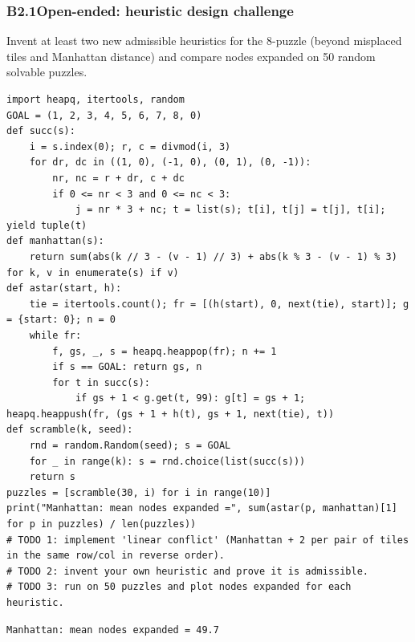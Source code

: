 \documentclass[11pt]{article}
\begin{document}
\subsubsection*{B2.1\quad Open-ended: heuristic design challenge}
Invent at least two new admissible heuristics for the 8-puzzle (beyond misplaced tiles and Manhattan distance) and compare nodes expanded on 50 random solvable puzzles.
\begin{lstlisting}[style=py]
import heapq, itertools, random
GOAL = (1, 2, 3, 4, 5, 6, 7, 8, 0)
def succ(s):
    i = s.index(0); r, c = divmod(i, 3)
    for dr, dc in ((1, 0), (-1, 0), (0, 1), (0, -1)):
        nr, nc = r + dr, c + dc
        if 0 <= nr < 3 and 0 <= nc < 3:
            j = nr * 3 + nc; t = list(s); t[i], t[j] = t[j], t[i]; yield tuple(t)
def manhattan(s):
    return sum(abs(k // 3 - (v - 1) // 3) + abs(k % 3 - (v - 1) % 3) for k, v in enumerate(s) if v)
def astar(start, h):
    tie = itertools.count(); fr = [(h(start), 0, next(tie), start)]; g = {start: 0}; n = 0
    while fr:
        f, gs, _, s = heapq.heappop(fr); n += 1
        if s == GOAL: return gs, n
        for t in succ(s):
            if gs + 1 < g.get(t, 99): g[t] = gs + 1; heapq.heappush(fr, (gs + 1 + h(t), gs + 1, next(tie), t))
def scramble(k, seed):
    rnd = random.Random(seed); s = GOAL
    for _ in range(k): s = rnd.choice(list(succ(s)))
    return s
puzzles = [scramble(30, i) for i in range(10)]
print("Manhattan: mean nodes expanded =", sum(astar(p, manhattan)[1] for p in puzzles) / len(puzzles))
# TODO 1: implement 'linear conflict' (Manhattan + 2 per pair of tiles in the same row/col in reverse order).
# TODO 2: invent your own heuristic and prove it is admissible.
# TODO 3: run on 50 puzzles and plot nodes expanded for each heuristic.
\end{lstlisting}
\begin{lstlisting}[style=out]
Manhattan: mean nodes expanded = 49.7
\end{lstlisting}
\end{document}
